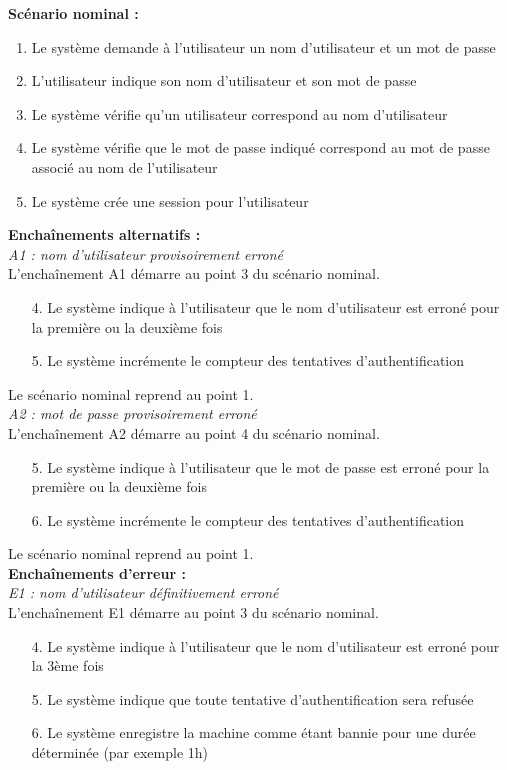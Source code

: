 \documentclass[12pt , a4paper]{article}
\begin{document}
\noindent\textbf{Scénario nominal :}
\begin{enumerate}
\item Le système demande à l'utilisateur un nom d'utilisateur et un mot de passe
\item L'utilisateur indique son nom d'utilisateur et son mot de passe
\item Le système vérifie qu'un utilisateur correspond au nom d'utilisateur
\item Le système vérifie que le mot de passe indiqué correspond au mot de passe associé au nom de l'utilisateur
\item Le système crée une session pour l'utilisateur \\
\end{enumerate}


\noindent\textbf{Encha\^inements alternatifs :}\\
\noindent\textit{A1 : nom d'utilisateur provisoirement erroné}\\
L'encha\^inement A1 démarre au point 3 du scénario nominal.
\begin{enumerate}
\item[4.] Le système indique à l'utilisateur que le nom d'utilisateur est erroné pour la première ou la deuxième fois
\item[5.] Le système incrémente le compteur des tentatives d'authentification
\end{enumerate}
Le scénario nominal reprend au point 1.\\


\noindent\textit{A2 : mot de passe provisoirement erroné}\\
L'encha\^inement A2 démarre au point 4 du scénario nominal.
\begin{enumerate}
\item[5.] Le système indique à l'utilisateur que le mot de passe est erroné pour la première ou la deuxième fois
\item[6.] Le système incrémente le compteur des tentatives d'authentification
\end{enumerate}
Le scénario nominal reprend au point 1.\\


\noindent\textbf{Encha\^inements d'erreur :}\\
\noindent\textit{E1 : nom d'utilisateur définitivement erroné}\\
L'encha\^inement E1 démarre au point 3 du scénario nominal.
\begin{enumerate}
\item[4.] Le système indique à l'utilisateur que le nom d'utilisateur est erroné pour la 3ème fois
\item[5.] Le système indique que toute tentative d'authentification sera refusée
\item[6.] Le système enregistre la machine comme étant bannie pour une durée déterminée (par exemple 1h)
\end{enumerate}
\end{document}

